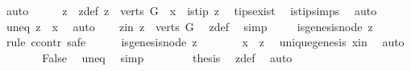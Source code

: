 \begin{isabellebody}
\ auto\isanewline
\ \ \isamarkupfalse%
\ \isamarkupfalse%
\ z\ \ z{\isacharunderscore}{\kern0pt}def{\isacharcolon}{\kern0pt}\ {\isachardoublequoteopen}z\ {\isasymin}\ {\isacharparenleft}{\kern0pt}verts\ G{\isacharparenright}{\kern0pt}\ {\isacharminus}{\kern0pt}\ {\isacharbraceleft}{\kern0pt}x{\isacharbraceright}{\kern0pt}\ {\isasymand}\ is{\isacharunderscore}{\kern0pt}tip\ z{\isachardoublequoteclose}\ \isamarkupfalse%
\ tips{\isacharunderscore}{\kern0pt}exist\isanewline
\ \ is{\isacharunderscore}{\kern0pt}tip{\isachardot}{\kern0pt}simps\ \isamarkupfalse%
\ auto\isanewline
\ \ \isamarkupfalse%
\ \isamarkupfalse%
\ uneq{\isacharcolon}{\kern0pt}\ {\isachardoublequoteopen}z\ {\isasymnoteq}\ x{\isachardoublequoteclose}\ \isamarkupfalse%
\ auto\isanewline
\ \ \isamarkupfalse%
\ z{\isacharunderscore}{\kern0pt}in{\isacharcolon}{\kern0pt}\ {\isachardoublequoteopen}z\ {\isasymin}\ verts\ G{\isachardoublequoteclose}\ \isamarkupfalse%
\ z{\isacharunderscore}{\kern0pt}def\ \isamarkupfalse%
\ simp\isanewline
\ \ \isamarkupfalse%
\ {\isachardoublequoteopen}{\isasymnot}\ is{\isacharunderscore}{\kern0pt}genesis{\isacharunderscore}{\kern0pt}node\ z{\isachardoublequoteclose}\isanewline
\ \ \isamarkupfalse%
\ {\isacharparenleft}{\kern0pt}rule\ ccontr{\isacharcomma}{\kern0pt}\ safe{\isacharparenright}{\kern0pt}\isanewline
\ \ \ \ \isamarkupfalse%
\ {\isachardoublequoteopen}is{\isacharunderscore}{\kern0pt}genesis{\isacharunderscore}{\kern0pt}node\ z{\isachardoublequoteclose}\isanewline
\ \ \ \ \isamarkupfalse%
\ \isamarkupfalse%
\ {\isachardoublequoteopen}x\ {\isacharequal}{\kern0pt}\ z{\isachardoublequoteclose}\ \isamarkupfalse%
\ unique{\isacharunderscore}{\kern0pt}genesis\ x{\isacharunderscore}{\kern0pt}in\ \isamarkupfalse%
\ auto\isanewline
\ \ \ \ \isamarkupfalse%
\ \isamarkupfalse%
\ False\ \isamarkupfalse%
\ uneq\ \isamarkupfalse%
\ simp\isanewline
\ \ \isamarkupfalse%
\isanewline
\ \ \isamarkupfalse%
\ \isamarkupfalse%
\ {\isachardoublequoteopen}{\isacharquery}{\kern0pt}thesis{\isachardoublequoteclose}\ \isamarkupfalse%
\ z{\isacharunderscore}{\kern0pt}def\ \isamarkupfalse%
\ auto\isanewline
{}\isamarkupfalse%

\end{isabellebody}

